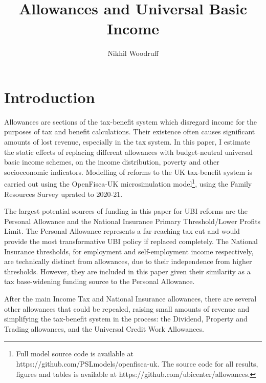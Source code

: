 \documentclass{article}
\title{Allowances and Universal Basic Income}
\author{Nikhil Woodruff}
\begin{document}
    \maketitle
    \section{Introduction}
    Allowances are sections of the tax-benefit system which disregard income for the purposes of tax and benefit calculations. Their existence often causes significant amounts of lost revenue, especially in the tax system. In this paper, I estimate the static effects of replacing different allowances with budget-neutral universal basic income schemes, on the income distribution, poverty and other socioeconomic indicators. Modelling of reforms to the UK tax-benefit system is carried out using the OpenFisca-UK microsimulation model\footnote{Full model source code is available at https://github.com/PSLmodels/openfisca-uk. The source code for all results, figures and tables is available at https://github.com/ubicenter/allowances.}, using the Family Resources Survey uprated to 2020-21. 

    The largest potential sources of funding in this paper for UBI reforms are the Personal Allowance and the National Insurance Primary Threshold/Lower Profits Limit. The Personal Allowance represents a far-reaching tax cut and would provide the most transformative UBI policy if replaced completely. The National Insurance thresholds, for employment and self-employment income respectively, are technically distinct from allowances, due to their independence from higher thresholds. However, they are included in this paper given their similarity as a tax base-widening funding source to the Personal Allowance. 
    
    After the main Income Tax and National Insurance allowances, there are several other allowances that could be repealed, raising small amounts of revenue and simplifying the tax-benefit system in the process: the Dividend, Property and Trading allowances, and the Universal Credit Work Allowances.
\end{document}
